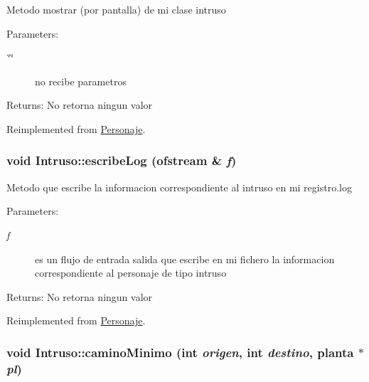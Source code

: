 Metodo mostrar (por pantalla) de mi clase intruso \begin{Desc}
\item[Parameters:]
\begin{description}
\item[{\em \char`\"{}\char`\"{}}]no recibe parametros \end{description}
\end{Desc}
\begin{Desc}
\item[Returns:]No retorna ningun valor \end{Desc}


Reimplemented from \hyperlink{classPersonaje_e9f6bd8027b8a5c2e660a327d9e513ca}{Personaje}.\hypertarget{classIntruso_979c89c596d92d8ce69b8af5e556d62d}{
\subsubsection[escribeLog]{\setlength{\rightskip}{0pt plus 5cm}void Intruso::escribeLog (ofstream \& {\em f})}}
\label{classIntruso_979c89c596d92d8ce69b8af5e556d62d}


Metodo que escribe la informacion correspondiente al intruso en mi registro.log \begin{Desc}
\item[Parameters:]
\begin{description}
\item[{\em f}]es un flujo de entrada salida que escribe en mi fichero la informacion correspondiente al personaje de tipo intruso \end{description}
\end{Desc}
\begin{Desc}
\item[Returns:]No retorna ningun valor \end{Desc}


Reimplemented from \hyperlink{classPersonaje_86fe4a1ff708072d98c6be42bbd512ea}{Personaje}.\hypertarget{classIntruso_6d239cda2dc32af27e50ba84524e4179}{
\subsubsection[caminoMinimo]{\setlength{\rightskip}{0pt plus 5cm}void Intruso::caminoMinimo (int {\em origen}, \/  int {\em destino}, \/  {\bf planta} $\ast$ {\em pl})}}
\label{classIntruso_6d239cda2dc32af27e50ba84524e4179}


